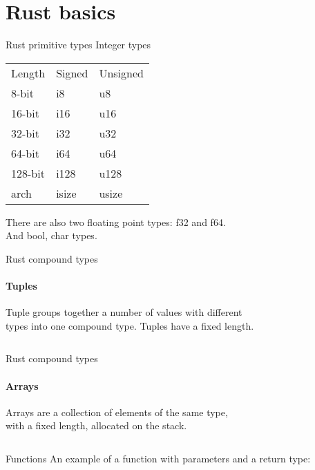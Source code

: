 \documentclass[usenames,dvipsnames,10pt,aspectratio=169]{beamer}
\begin{document}

\section{Rust basics}
\begin{frame}{Rust primitive types} 
\centering
\large
Integer types
\begin{table}[]
\begin{tabular}{lll}
Length  & Signed & Unsigned \\
8-bit   & i8     & u8       \\
16-bit  & i16    & u16      \\
32-bit  & i32    & u32      \\
64-bit  & i64    & u64      \\
128-bit & i128   & u128     \\
arch    & isize  & usize   
\end{tabular}
\end{table}
\vspace{0.5cm}
There are also two floating point types:
\textcolor{ucuyellow}{f32} and \textcolor{ucuyellow}{f64}.\\
And \textcolor{ucuyellow}{bool}, \textcolor{ucuyellow}{char} types.
\end{frame}

\begin{frame}{Rust compound types}
\framesubtitle{Tuples}
Tuple groups together a number of values with different\\
types into one compound type. Tuples have a fixed length.\\
\vspace{0.2cm}
\inputminted[fontsize=\large]{rust}{code/tuple.rs}
\vspace{0.5cm}
\end{frame}

\begin{frame}{Rust compound types}
\framesubtitle{Arrays}
Arrays are a collection of elements of the same type,\\
with a fixed length, allocated on the stack.
\vspace{0.2cm}
\inputminted[fontsize=\large]{rust}{code/array.rs}
\vspace{0.5cm}
\end{frame}

\begin{frame}{Functions}
\large
An example of a function with parameters and a return type:
\vspace{0.2cm}
\inputminted[fontsize=\large]{rust}{code/function.rs}
\vspace{0.5cm}
\end{frame}
\end{document}

